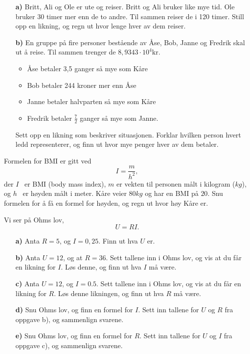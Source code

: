 \documentclass[a4, 11pt, twoside]{article}
\theoremstyle{definition}
\begin{document}
\begin{Exercise}
\begin{itemize}
 \item[\bf a)]
 Britt, Ali og Ole er ute og reiser.
 Britt og Ali bruker like mye tid. Ole bruker 30 timer mer enn de to andre.
 Til sammen reiser de i 120 timer. Still opp en likning, og regn ut
 hvor lenge hver av dem reiser.

 \item[\bf b)]
 En gruppe på fire personer bestående av Åse, Bob, Janne og Fredrik skal
 ut å reise. Til sammen trenger de
 $8,9343\cdot10^4\text{kr}$.
 \begin{itemize}
  \item Åse betaler 3,5 ganger så mye som Kåre
  \item Bob betaler 244 kroner mer enn Åse
  \item Janne betaler halvparten så mye som Kåre
  \item Fredrik betaler $\frac{7}{2}$ ganger så mye som Janne.
 \end{itemize}
 Sett opp en likning som beskriver situasjonen. Forklar hvilken
 person hvert ledd representerer, og finn ut hvor mye penger hver
 av dem betaler.
\end{itemize}
\end{Exercise}

\begin{Exercise}
Formelen for BMI er gitt ved \[I = \frac{m}{h^2}, \]
der $I$  er BMI (body mass index), $m$ er vekten til personen målt i kilogram
($kg$),
    og $h$  er høyden målt i meter. 
    Kåre veier $80 kg$ og har en BMI på $20$. Snu formelen for å få en
    formel for høyden, og regn ut hvor høy Kåre er.
\end{Exercise}

\begin{Exercise}
Vi ser på Ohms lov, \[ U = RI. \]
\begin{itemize}
\item[\bf a)] Anta $R = 5$, og $I = 0,25$. Finn ut hva $U$ er.
\item[\bf b)] Anta $U = 12$, og at $R = 36$. Sett tallene inn i Ohms lov, og vis at du får en likning
for $I$. Løs denne, og finn ut hva $I$ må være.
\item[\bf c)] Anta $U = 12$, og $I = 0.5$. Sett tallene inn i Ohms lov, og vis at du får en likning for
$R$. Løs denne likningen, og finn ut hva $R$ må være.
\item[\bf d)] Snu Ohms lov, og finn en formel for $I$. Sett inn tallene for $U$ og $R$ fra oppgave b),
og sammenlign svarene.
\item[\bf e)] Snu Ohms lov, og finn en formel for $R$. Sett inn tallene for $U$ og $I$ fra oppgave c),
og sammenlign svarene.
\end{itemize}
\end{Exercise}
\end{document}
